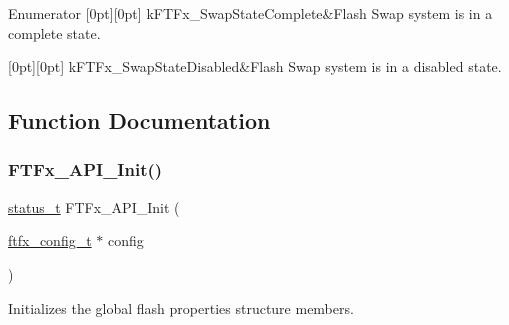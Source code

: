 \begin{DoxyEnumFields}{Enumerator}
[0pt][0pt]{}\mbox{\label{group__ftfx__controller_ggac6715381632a07d502632b03f8cfb402ab808523acebe2fad478d2a5136f3d782}} 
k\+F\+T\+Fx\+\_\+\+Swap\+State\+Complete&Flash Swap system is in a complete state. \\
\hline

[0pt][0pt]{}\mbox{\label{group__ftfx__controller_ggac6715381632a07d502632b03f8cfb402ac59f9257ba267cf49f52ce56aadd2bba}} 
k\+F\+T\+Fx\+\_\+\+Swap\+State\+Disabled&Flash Swap system is in a disabled state. \\
\hline

\end{DoxyEnumFields}


\subsection{Function Documentation}
\mbox{\label{group__ftfx__controller_ga40e6294a537acf6f902b01bdf4cafa27}} 
\subsubsection{\texorpdfstring{FTFx\_API\_Init()}{FTFx\_API\_Init()}}
{\footnotesize\ttfamily \mbox{\hyperlink{group__ksdk__common_gaaabdaf7ee58ca7269bd4bf24efcde092}{status\+\_\+t}} F\+T\+Fx\+\_\+\+A\+P\+I\+\_\+\+Init (\begin{DoxyParamCaption}\item[{\mbox{\hyperlink{group__ftfx__controller_gab0196063c05bffb4cd2f249699a3378c}{ftfx\+\_\+config\+\_\+t}} $\ast$}]{config }\end{DoxyParamCaption})}



Initializes the global flash properties structure members. 


